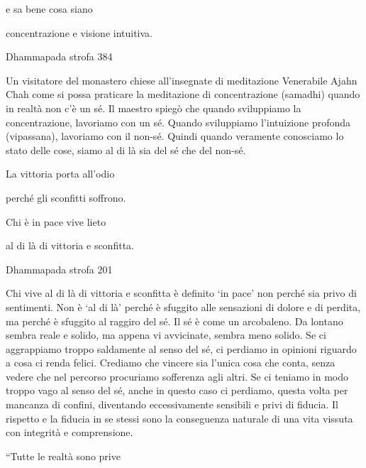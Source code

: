 \documentclass[a4paper,portrait,12pt]{article}
\begin{document}
e sa bene cosa  siano  


concentrazione e visione intuitiva.





Dhammapada strofa 384


\newpage



Un visitatore del monastero chiese all'insegnate di meditazione Venerabile Ajahn Chah come si possa praticare la meditazione di concentrazione (samadhi) quando in realt\`{a} non c'\`{e} un s\'{e}. Il maestro spieg\`{o} che quando sviluppiamo la concentrazione, lavoriamo con un s\'{e}. Quando sviluppiamo l'intuizione profonda (vipassana), lavoriamo con il non-s\'{e}. Quindi quando veramente conosciamo lo stato delle cose, siamo al di l\`{a} sia del s\'{e} che del non-s\'{e}. 


\newpage



La vittoria porta all'odio


perch\'{e} gli sconfitti soffrono.


Chi \`{e} in pace vive lieto


al di l\`{a} di vittoria e sconfitta.





Dhammapada strofa 201


\newpage



Chi vive al di l\`{a} di vittoria e sconfitta \`{e} definito `in pace' non perch\'{e} sia privo di sentimenti. Non \`{e} `al di l\`{a}' perch\'{e} \`{e} sfuggito alle sensazioni di dolore e di perdita, ma perch\'{e} \`{e} sfuggito al raggiro del s\'{e}. Il s\'{e} \`{e} come un arcobaleno. Da lontano sembra reale e solido, ma appena vi avvicinate, sembra meno solido. Se ci aggrappiamo troppo saldamente al senso del s\'{e}, ci perdiamo in opinioni riguardo a cosa ci renda felici. Crediamo che vincere sia l'unica cosa che conta, senza vedere che nel percorso procuriamo sofferenza agli altri. Se ci teniamo in modo troppo vago al senso del s\'{e}, anche in questo caso ci perdiamo, questa volta per mancanza di confini, diventando eccessivamente sensibili e privi di fiducia. Il rispetto e la fiducia in se stessi sono la conseguenza naturale di una vita vissuta con integrit\`{a} e comprensione.   


\newpage



``Tutte le realt\`{a} sono prive 
\end{document}
